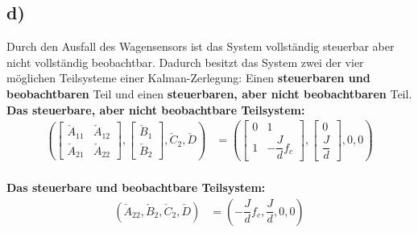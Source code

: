 \documentclass[11pt]{scrartcl} %
\begin{document}
\subsection*{d)}
Durch den Ausfall des Wagensensors ist das System vollständig steuerbar aber nicht vollständig beobachtbar. Dadurch besitzt das System zwei der vier möglichen Teilsysteme einer Kalman-Zerlegung: Einen \textbf{steuerbaren und beobachtbaren} Teil und einen \textbf{steuerbaren, aber nicht beobachtbaren} Teil.\\

\textbf{Das steuerbare, aber nicht beobachtbare Teilsystem:}
\begin{align*}
\left( \begin{bmatrix}
\check{A}_{11} & \check{A}_{12}\\
\check{A}_{21} & \check{A}_{22}
\end{bmatrix}, \begin{bmatrix}
\check{B}_1\\
\check{B}_2
\end{bmatrix}, \check{C}_2, \check{D} \right) 
&=
\left( \begin{bmatrix}
0 & 1\\
1 & - \dfrac{J}{d} f_c
\end{bmatrix}, \begin{bmatrix}
0\\
\dfrac{J}{d}
\end{bmatrix}, 0, 0 \right)
\end{align*}\\

\textbf{Das steuerbare und beobachtbare Teilsystem:}
\begin{align*}
\left( \check{A}_{22}, \check{B}_{2}, \check{C}_2, \check{D} \right)
&=
\left( - \dfrac{J}{d} f_c, \dfrac{J}{d}, 0, 0 \right)
\end{align*}
\end{document}
